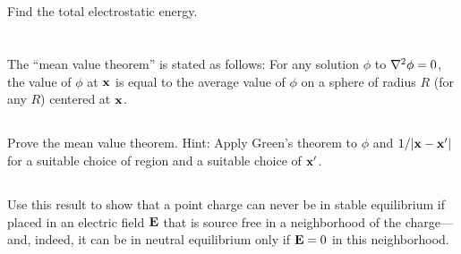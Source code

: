 \documentclass[11pt]{article}
\newenvironment{statement}[1]
{
	\section{#1}
	\color{darkgray}
	\ignorespaces
}
{
}
\newenvironment{problem}
{
	\subsection{}
	\color{darkgray}
    \ignorespaces
}
{

}
\begin{document}
\begin{problem}
	Find the total electrostatic energy.
\end{problem}







\begin{statement}{}
	The ``mean value theorem'' is stated as follows: For any solution $\phi$ to $\nabla^2 \phi = 0$, the value of $\phi$ at $\mathbf{x}$ is equal to the average value of $\phi$ on a sphere of radius $R$ (for any $R$) centered at $\mathbf{x}$.
\end{statement}

\begin{problem}
	Prove the mean value theorem.  Hint: Apply Green's theorem to $\phi$ and $1/\abs{\mathbf{x} - \mathbf{x}'}$ for a suitable choice of region and a suitable choice of $\mathbf{x}'$.
\end{problem}

\begin{problem}
	Use this result to show that a point charge can never be in stable equilibrium if placed in an electric field $\mathbf{E}$ that is source free in a neighborhood of the charge---and, indeed, it can be in neutral equilibrium only if $\mathbf{E} = 0$ in this neighborhood.
\end{problem}

\end{document}
